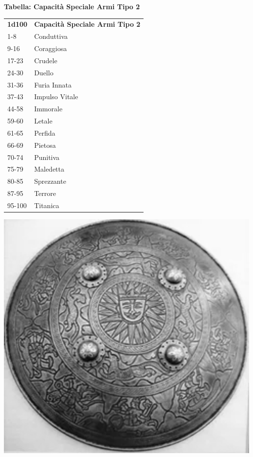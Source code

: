 \begin{multicols}{2}
%
%

\textbf{Tabella: Capacità Speciale Armi Tipo 2}

\medskip

\begin{tabular}{ll}
\textbf{1d100} & \textbf{Capacità Speciale Armi Tipo 2}\\
1-8& Conduttiva\\
9-16&Coraggiosa\\
17-23&Crudele\\
24-30&Duello\\
31-36&Furia Innata\\
37-43&Impulso Vitale\\
44-58&Immorale\\
59-60&Letale\\
61-65&Perfida\\
66-69&Pietosa\\
70-74&Punitiva\\
75-79&Maledetta\\
80-85&Sprezzante\\
87-95&Terrore\\
95-100 &Titanica\\
\end{tabular}

\bigskip

\begin{center}
\includegraphics[width=0.7\linewidth]{immagini/shield1.png}
\end{center}


\end{multicols}
